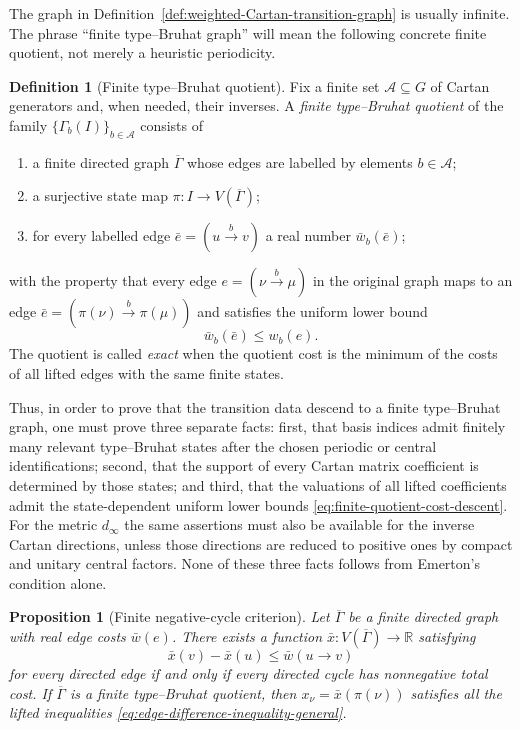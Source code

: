 \documentclass[12pt]{article}
\newtheorem{proposition}[theorem]{Proposition}
\theoremstyle{definition}
\newtheorem{definition}[theorem]{Definition}
\theoremstyle{remark}
\begin{document}
The graph in Definition~\ref{def:weighted-Cartan-transition-graph} is
usually infinite.  The phrase ``finite type--Bruhat graph'' will mean the
following concrete finite quotient, not merely a heuristic periodicity.

\begin{definition}[Finite type--Bruhat quotient]
\label{def:finite-type-Bruhat-quotient}
Fix a finite set $\mathcal A\subseteq G$ of Cartan generators and, when
needed, their inverses.  A \emph{finite type--Bruhat quotient} of the family
$\{\Gamma_b(I)\}_{b\in\mathcal A}$ consists of
\begin{enumerate}
 \item a finite directed graph $\overline\Gamma$ whose edges are labelled by
 elements $b\in\mathcal A$;
 \item a surjective state map $\pi:I\to V(\overline\Gamma)$;
 \item for every labelled edge
 $\bar e=(u\xrightarrow{b}v)$ a real number $\bar w_b(\bar e)$;
\end{enumerate}
with the property that every edge
$e=(\nu\xrightarrow{b}\mu)$ in the original graph maps to an edge
$\bar e=(\pi(\nu)\xrightarrow{b}\pi(\mu))$ and satisfies the uniform lower
bound
\begin{equation}\label{eq:finite-quotient-cost-descent}
 \bar w_b(\bar e)\leq w_b(e).
\end{equation}
The quotient is called \emph{exact} when the quotient cost is the minimum of
the costs of all lifted edges with the same finite states.
\end{definition}

Thus, in order to prove that the transition data descend to a finite
type--Bruhat graph, one must prove three separate facts: first, that basis
indices admit finitely many relevant type--Bruhat states after the chosen
periodic or central identifications; second, that the support of every
Cartan matrix coefficient is determined by those states; and third, that the
valuations of all lifted coefficients admit the state-dependent uniform
lower bounds \eqref{eq:finite-quotient-cost-descent}.  For the metric
$d_\infty$ the same assertions must also be available for the inverse Cartan
directions, unless those directions are reduced to positive ones by compact
and unitary central factors.  None of these three facts follows from
Emerton's condition alone.

\begin{proposition}[Finite negative-cycle criterion]
\label{prop:finite-negative-cycle-criterion}
Let $\overline\Gamma$ be a finite directed graph with real edge costs
$\bar w(e)$.  There exists a function
$\bar x:V(\overline\Gamma)\to\mathbb R$ satisfying
\begin{equation}\label{eq:finite-difference-system}
 \bar x(v)-\bar x(u)\leq\bar w(u\to v)
\end{equation}
for every directed edge if and only if every directed cycle has nonnegative
total cost.  If $\overline\Gamma$ is a finite type--Bruhat quotient, then
$x_\nu=\bar x(\pi(\nu))$ satisfies all the lifted inequalities
\eqref{eq:edge-difference-inequality-general}.
\end{proposition}
\end{document}
